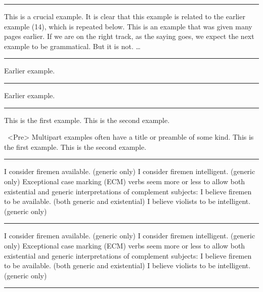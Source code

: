 \documentclass[12pt]{article}
\begin{document}
\filbreak\hrule\medskip

\begingroup
{}
\ex This is a crucial example.\xe
It is clear that this example is related to the earlier
example (14), which is repeated below.
\ex[exno=14]
This is an example that was given many pages earlier.\xe
If we are on the right track, as the saying goes,
we expect the next example to be grammatical.  But it is not.
\ex * \dots\xe
\endgroup
\bigskip

\filbreak\hrule\medskip

\begingroup
\ex[exno=$\Delta$] Earlier example.\xe
\endgroup
\bigskip

\filbreak\hrule\medskip

\begingroup
\ex[exno={[14, repeated]},exnoformat=X] Earlier example.\xe
\endgroup
\bigskip

\filbreak\hrule\medskip

\begingroup
\pex
\a This is the first example.
\a This is the second example.
\xe

\pex~<Pre> Multipart examples often have a title or preamble of some
kind.
\a This is the first example.
\a This is the second example.
\xe
\endgroup
\bigskip

\filbreak\hrule\medskip

\begingroup
\keepexcntlocal {}
\pex
\a I consider firemen available. (generic only)
\a I consider firemen intelligent. (generic only)
\xe
Exceptional case marking (ECM) verbs seem more or less to allow both
existential and generic interpretations of complement subjects:
\pex
\a I believe firemen to be available. (both generic and existential)
\a I believe violists to be intelligent. (generic only)
\xe
\endgroup
\bigskip

\filbreak\hrule\medskip

\begingroup
\keepexcntlocal {}
\pex[sampleexno=(10)]
\a I consider firemen available. (generic only)
\a I consider firemen intelligent. (generic only)
\xe
Exceptional case marking (ECM) verbs seem more or less to allow both
existential and generic interpretations of complement subjects:
\pex
\a I believe firemen to be available. (both generic and existential)
\a I believe violists to be intelligent. (generic only)
\xe
\endgroup
\bigskip

\filbreak\hrule\medskip

\begingroup
{}
\endgroup
\bigskip
\end{document}
